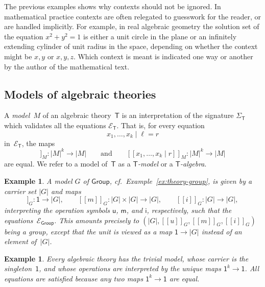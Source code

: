 \documentclass{amsart}
\newcommand{\theory}[1]{\mathsf{#1}} %
\newcommand{\signature}[1]{\Sigma_{\theory{#1}}} %
\newcommand{\equations}[1]{\mathcal{E}_{\theory{#1}}} %
\newcommand{\carrier}[1]{|#1|} %
\newcommand{\one}{\mathsf{1}} %
\newcommand{\sem}[1]{[\![#1]\!]} %
\newtheorem{example}[definition]{Example}
\begin{document}
The previous examples shows why contexts should not be ignored. In mathematical practice
contexts are often relegated to guesswork for the reader, or are handled implicitly. For
example, in real algebraic geometry the solution set of the equation $x^2 + y^2 = 1$ is
either a unit circle in the plane or an infinitely extending cylinder of unit radius in
the space, depending on whether the context might be $x, y$ or $x, y, z$. Which context is
meant is indicated one way or another by the author of the mathematical text.

\subsection{Models of algebraic theories}
\label{sec:models-algebr-theor}

A \emph{model~$M$} of an algebraic theory~$\theory{T}$ is an interpretation of the signature
$\signature{T}$ which validates all the equations $\equations{T}$. That is, for every
equation
%
\begin{equation*}
  x_1, \ldots, x_k \mid \ell = r
\end{equation*}
%
in~$\equations{T}$, the maps
%
\begin{equation*}
  \sem{x_1, \ldots, x_k \mid \ell}_M : \carrier{M}^k \to \carrier{M}
  \qquad\text{and}\qquad
  \sem{x_1, \ldots, x_k \mid r}_M : \carrier{M}^k \to \carrier{M}
\end{equation*}
%
are equal. We refer to a model of~$\theory{T}$ as a \emph{$\theory{T}$-model} or
a \emph{$\theory{T}$-algebra}.

\begin{example}
  A model $G$ of $\theory{Group}$, cf.\ Example~\ref{ex:theory-group}, is given by a
  carrier set $\carrier{G}$ and maps
  \begin{equation*}
    \sem{u}_G : \one \to \carrier{G},\qquad
    \sem{m}_G : \carrier{G} \times \carrier{G} \to \carrier{G},\qquad
    \sem{i}_G : \carrier{G} \to \carrier{G},
  \end{equation*}
  interpreting the operation symbols $\mathsf{u}$, $\mathsf{m}$, and
  $\mathsf{i}$, respectively, such that the equations~$\equations{Group}$. This
  amounts precisely to $(\carrier{G}, \sem{u}_G, \sem{m}_G, \sem{i}_G)$ being a
  group, except that the unit is viewed as a map $\one \to \carrier{G}$ instead
  of an element of~$\carrier{G}$.
\end{example}

\begin{example}
  Every algebraic theory has the \emph{trivial model}, whose carrier is the
  singleton~$\one$, and whose operations are interpreted by the unique maps
  $\one^k \to \one$. All equations are satisfied because any two maps $\one^k \to \one$
  are equal.
\end{example}
\end{document}
